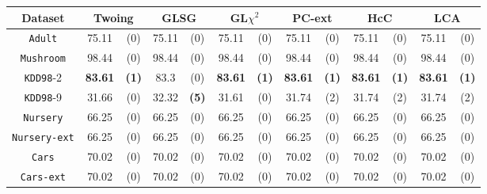 \begin{table}
\scriptsize
\centering
\begin{tabular}{c|cc|cc|cc|cc|cc|cc} 
Dataset             & \multicolumn{2}{c|}{Twoing} &  \multicolumn{2}{c|}{GLSG}  & \multicolumn{2}{c|}{GL$\chi^2$} & \multicolumn{2}{c|}{PC-ext}& \multicolumn{2}{c|}{HcC} & \multicolumn{2}{c}{LCA} \\
\hline
{\tt Adult}         &  75.11       & (0)          &  75.11       & (0)          &  75.11       & (0)              & 75.11      & (0)           & 75.11      & (0)        & 75.11      & (0)        \\
{\tt Mushroom}      &  98.44       & (0)          &  98.44       & (0)          &  98.44       & (0)              & 98.44      & (0)           & 98.44      & (0)        & 98.44      & (0)        \\
{\tt KDD98}-2       &  {\bf 83.61} & {\bf (1)}    &  83.3        & (0)          &  {\bf 83.61} & {\bf (1)}        &{\bf 83.61} & {\bf (1)}     & {\bf 83.61}& {\bf (1)}  & {\bf 83.61}& {\bf (1)}  \\
{\tt KDD98}-9       &  31.66       & (0)          &  32.32       & {\bf (5)}    &  31.61       & (0)              & 31.74      & (2)           & 31.74      & (2)        & 31.74       & (2)       \\
{\tt Nursery}       &  66.25       & (0)          &  66.25       & (0)          &  66.25       & (0)              & 66.25      & (0)           & 66.25      & (0)        & 66.25       & (0)       \\
{\tt Nursery-ext}   &  66.25       & (0)          &  66.25       & (0)          &  66.25       & (0)              & 66.25      & (0)           & 66.25      & (0)        & 66.25       & (0)       \\
{\tt Cars}          &  70.02       & (0)          &  70.02       & (0)          &  70.02       & (0)              & 70.02      & (0)           & 70.02      & (0)        & 70.02       & (0)       \\
{\tt Cars-ext}      &  70.02       & (0)          &  70.02       & (0)          &  70.02       & (0)              & 70.02      & (0)           & 70.02      & (0)        & 70.02       & (0)       \\

\end{tabular}
\end{table}
